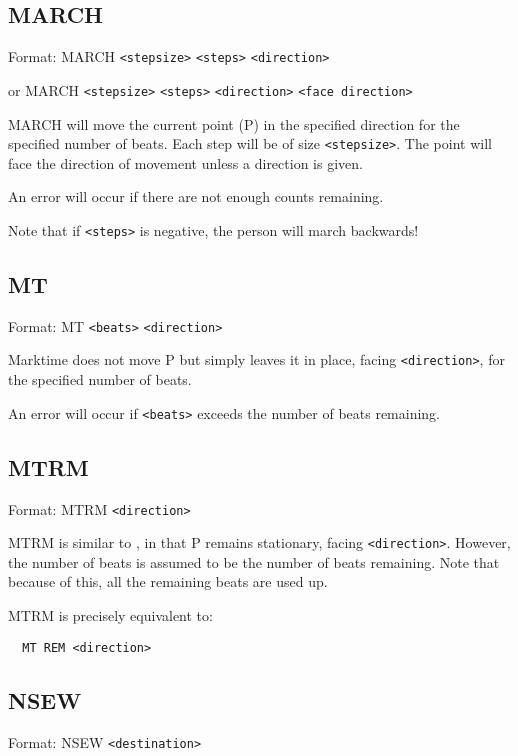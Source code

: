 \subsection{MARCH}\label{march}

Format: MARCH \verb$<stepsize>$ \verb$<steps>$ \verb$<direction>$

or MARCH \verb$<stepsize>$ \verb$<steps>$ \verb$<direction>$
\verb$<face direction>$

MARCH will move the current point (P) in the specified direction for the
specified number of beats.  Each step will be of size
\verb$<stepsize>$.  The point will face the direction of movement unless
a direction is given.

An error will occur if there are not enough counts remaining.

Note that if \verb$<steps>$ is negative, the person will march backwards!

\subsection{MT}\label{mt}

Format: MT \verb$<beats>$ \verb$<direction>$

Marktime does not move P but simply leaves it in place, facing
\verb$<direction>$, for the specified number of beats.

An error will occur if \verb$<beats>$ exceeds the number of beats remaining.

\subsection{MTRM}\label{mtrm}

Format: MTRM \verb$<direction>$

MTRM is similar to , in that P remains stationary,
facing \verb$<direction>$.  However, the number of beats is assumed to
be the number of beats remaining.  Note that because of this, all the
remaining beats are used up.

MTRM is precisely equivalent to:
\begin{verbatim}
  MT REM <direction>
\end{verbatim}

\subsection{NSEW}\label{nsew}

Format: NSEW \verb$<destination>$

